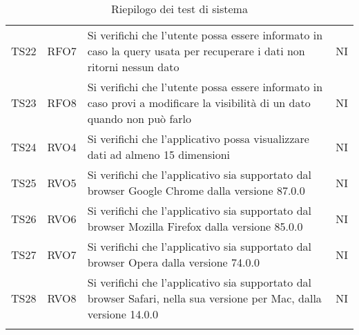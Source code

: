 \documentclass[../piano_di_qualifica.tex]{subfiles}
\begin{document}
\begin{center}
\begin{longtable}{|c|c|p{8cm}|c|}
		TS22              & RFO7                   & Si verifichi che l'utente possa essere informato in caso la query usata per recuperare i dati non ritorni nessun dato     & NI                         \\
		TS23              & RFO8                   & Si verifichi che l'utente possa essere informato in caso provi a modificare la visibilità di un dato quando non può farlo & NI                         \\
		TS24              & RVO4                   & Si verifichi che l'applicativo possa visualizzare dati ad almeno 15 dimensioni                                            & NI                         \\
		TS25              & RVO5                   & Si verifichi che l'applicativo sia supportato dal browser Google Chrome dalla versione 87.0.0                             & NI                         \\
		TS26              & RVO6                   & Si verifichi che l'applicativo sia supportato dal browser Mozilla Firefox dalla versione 85.0.0                           & NI                         \\
		TS27              & RVO7                   & Si verifichi che l'applicativo sia supportato dal browser Opera dalla versione 74.0.0                                     & NI                         \\
		TS28              & RVO8                   & Si verifichi che l'applicativo sia supportato dal browser Safari, nella sua versione per Mac, dalla versione 14.0.0       & NI                         \\
		\hline
		\rowcolor{white}
		\caption{Riepilogo dei test di sistema}
	\end{longtable}
\end{center}




\end{document}
